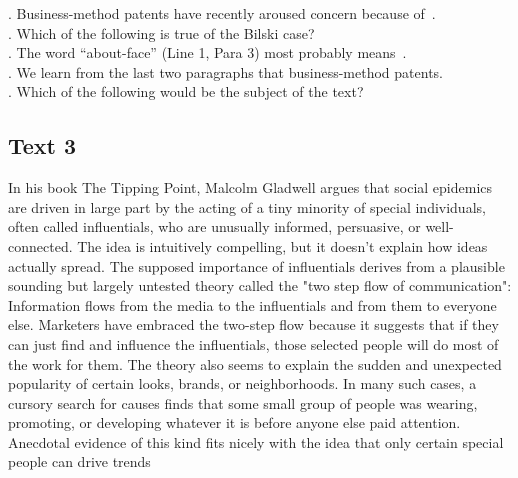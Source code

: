 \begin{questions} . Business-method patents have recently aroused concern because of .
\\ . Which of the following is true of the Bilski case?
\\ . The word “about-face” (Line 1, Para 3) most probably means .
\\ . We learn from the last two paragraphs that business-method patents.
\\ . Which of the following would be the subject of the text?
\\ \end{questions}      \subsection{Text 3}
In his book The Tipping Point, Malcolm Gladwell argues that social epidemics are driven in large part by the acting of a tiny minority of special individuals, often called influentials, who are unusually informed, persuasive, or well-connected. The idea is intuitively compelling, but it doesn't explain how ideas actually spread.
The supposed importance of influentials derives from a plausible sounding but largely untested theory called the "two step flow of communication": Information flows from the media to the influentials and from them to everyone else. Marketers have embraced the two-step flow because it suggests that if they can just find and influence the influentials, those selected people will do most of the work for them. The theory also seems to explain the sudden and unexpected popularity of certain looks, brands, or neighborhoods. In many such cases, a cursory search for causes finds that some small group of people was wearing, promoting, or developing whatever it is before anyone else paid attention. Anecdotal evidence of this kind fits nicely with the idea that only certain special people can drive trends
